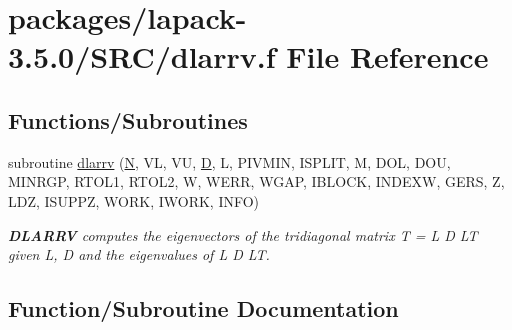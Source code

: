 \hypertarget{dlarrv_8f}{}\section{packages/lapack-\/3.5.0/\+S\+R\+C/dlarrv.f File Reference}
\label{dlarrv_8f}
\subsection*{Functions/\+Subroutines}
\begin{DoxyCompactItemize}
\item 
subroutine \hyperlink{dlarrv_8f_a420406ddf3a9d559a40543fa70829ae8}{dlarrv} (\hyperlink{polmisc_8c_a0240ac851181b84ac374872dc5434ee4}{N}, V\+L, V\+U, \hyperlink{odrpack_8h_a7dae6ea403d00f3687f24a874e67d139}{D}, L, P\+I\+V\+M\+I\+N, I\+S\+P\+L\+I\+T, M, D\+O\+L, D\+O\+U, M\+I\+N\+R\+G\+P, R\+T\+O\+L1, R\+T\+O\+L2, W, W\+E\+R\+R, W\+G\+A\+P, I\+B\+L\+O\+C\+K, I\+N\+D\+E\+X\+W, G\+E\+R\+S, Z, L\+D\+Z, I\+S\+U\+P\+P\+Z, W\+O\+R\+K, I\+W\+O\+R\+K, I\+N\+F\+O)
\begin{DoxyCompactList}\small\item\em {\bfseries D\+L\+A\+R\+R\+V} computes the eigenvectors of the tridiagonal matrix T = L D L\+T given L, D and the eigenvalues of L D L\+T. \end{DoxyCompactList}\end{DoxyCompactItemize}


\subsection{Function/\+Subroutine Documentation}
\hypertarget{dlarrv_8f_a420406ddf3a9d559a40543fa70829ae8}{}
